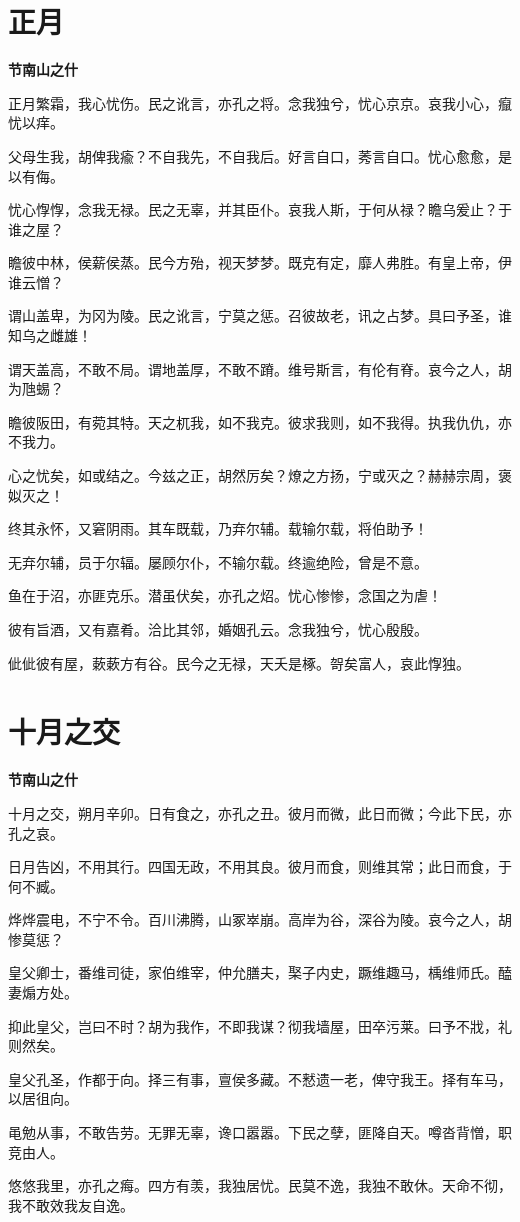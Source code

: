 \documentclass[12pt,a4paper]{ctexbook}
\begin{document}
\section{正月}
\textbf{节南山之什}\par\vspace{0.5em}
正月繁霜，我心忧伤。民之讹言，亦孔之将。念我独兮，忧心京京。哀我小心，癙忧以痒。\par
父母生我，胡俾我瘉？不自我先，不自我后。好言自口，莠言自口。忧心愈愈，是以有侮。\par
忧心惸惸，念我无禄。民之无辜，并其臣仆。哀我人斯，于何从禄？瞻乌爰止？于谁之屋？\par
瞻彼中林，侯薪侯蒸。民今方殆，视天梦梦。既克有定，靡人弗胜。有皇上帝，伊谁云憎？\par
谓山盖卑，为冈为陵。民之讹言，宁莫之惩。召彼故老，讯之占梦。具曰予圣，谁知乌之雌雄！\par
谓天盖高，不敢不局。谓地盖厚，不敢不蹐。维号斯言，有伦有脊。哀今之人，胡为虺蜴？\par
瞻彼阪田，有菀其特。天之杌我，如不我克。彼求我则，如不我得。执我仇仇，亦不我力。\par
心之忧矣，如或结之。今兹之正，胡然厉矣？燎之方扬，宁或灭之？赫赫宗周，褒姒灭之！\par
终其永怀，又窘阴雨。其车既载，乃弃尔辅。载输尔载，将伯助予！\par
无弃尔辅，员于尔辐。屡顾尔仆，不输尔载。终逾绝险，曾是不意。\par
鱼在于沼，亦匪克乐。潜虽伏矣，亦孔之炤。忧心惨惨，念国之为虐！\par
彼有旨酒，又有嘉肴。洽比其邻，婚姻孔云。念我独兮，忧心殷殷。\par
佌佌彼有屋，蔌蔌方有谷。民今之无禄，天夭是椓。哿矣富人，哀此惸独。\par

\section{十月之交}
\textbf{节南山之什}\par\vspace{0.5em}
十月之交，朔月辛卯。日有食之，亦孔之丑。彼月而微，此日而微；今此下民，亦孔之哀。\par
日月告凶，不用其行。四国无政，不用其良。彼月而食，则维其常；此日而食，于何不臧。\par
烨烨震电，不宁不令。百川沸腾，山冢崒崩。高岸为谷，深谷为陵。哀今之人，胡惨莫惩？\par
皇父卿士，番维司徒，家伯维宰，仲允膳夫，棸子内史，蹶维趣马，楀维师氏。醘妻煽方处。\par
抑此皇父，岂曰不时？胡为我作，不即我谋？彻我墙屋，田卒污莱。曰予不戕，礼则然矣。\par
皇父孔圣，作都于向。择三有事，亶侯多藏。不慭遗一老，俾守我王。择有车马，以居徂向。\par
黾勉从事，不敢告劳。无罪无辜，谗口嚣嚣。下民之孽，匪降自天。噂沓背憎，职竞由人。\par
悠悠我里，亦孔之痗。四方有羡，我独居忧。民莫不逸，我独不敢休。天命不彻，我不敢效我友自逸。\par
\end{document}
